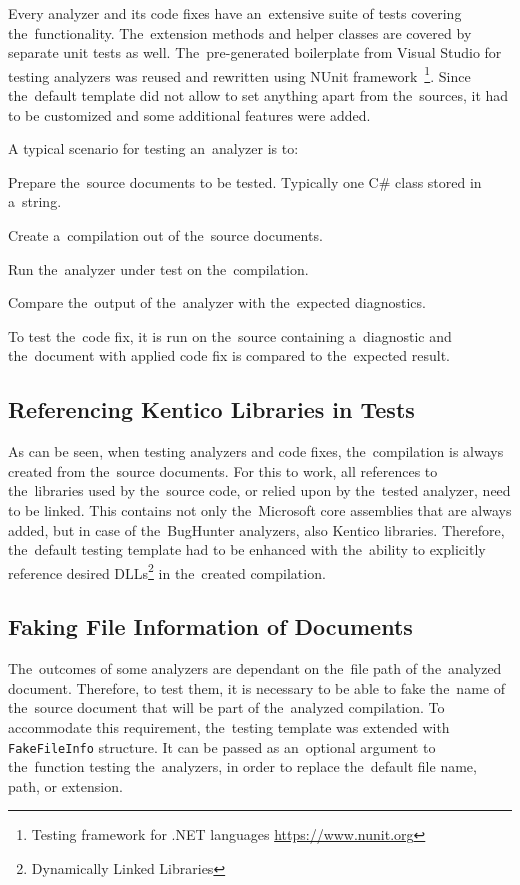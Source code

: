 \documentclass[
  digital, %
  table,   %
  lof,     %
  lot,     %
  oneside,
]{fithesis3}
\begin{document}
Every analyzer and its code fixes have an~extensive suite of tests covering the~functionality. The~extension methods and helper classes are covered by separate unit tests as well. The~pre-generated boilerplate from Visual Studio for testing analyzers was reused and rewritten using NUnit framework~\footnote{Testing framework for .NET languages \url{https://www.nunit.org}}. Since the~default template did not allow to set anything apart from the~sources, it had to be customized and some additional features were added.

A typical scenario for testing an~analyzer is to:
\begin{compactenum}
  \item Prepare the~source documents to be tested. Typically one C\# class stored in a~string.
  \item Create a~compilation out of the~source documents.
  \item Run the~analyzer under test on the~compilation.
  \item Compare the~output of the~analyzer with the~expected diagnostics.
\end{compactenum}

To test the~code fix, it is run on the~source containing a~diagnostic and the~document with applied code fix is compared to the~expected result.

\subsection{Referencing Kentico Libraries in Tests}
As can be seen, when testing analyzers and code fixes, the~compilation is always created from the~source documents. For this to work, all references to the~libraries used by the~source code, or relied upon by the~tested analyzer, need to be linked. This contains not only the~Microsoft core assemblies that are always added, but in case of the~BugHunter analyzers, also Kentico libraries. Therefore, the~default testing template had to be enhanced with the~ability to explicitly reference desired DLLs\footnote{Dynamically Linked Libraries} in the~created compilation.

\subsection{Faking File Information of Documents}
The~outcomes of some analyzers are dependant on the~file path of the~analyzed document. Therefore, to test them, it is necessary to be able to fake the~name of the~source document that will be part of the~analyzed compilation. To accommodate this requirement, the~testing template was extended with \texttt{FakeFileInfo} structure. It can be passed as an~optional argument to the~function testing the~analyzers, in order to replace the~default file name, path, or extension.
\end{document}
